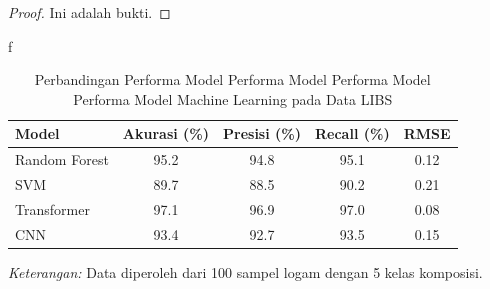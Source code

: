 \begin{proof}
Ini adalah bukti.
\end{proof}
 \begin{example}
        f
 \end{example}


 \begin{table}[H]
    \centering
    \caption{Perbandingan Performa Model Performa Model Performa Model Performa Model Machine Learning pada Data LIBS}
    \label{tab:performa_ml}
    \centering
    \begin{tabular}{lcccc}
      \toprule
      Model & Akurasi (\%) & Presisi (\%) & Recall (\%) & RMSE \\
      \midrule
      Random Forest & 95.2 & 94.8 & 95.1 & 0.12 \\
      SVM & 89.7 & 88.5 & 90.2 & 0.21 \\
      Transformer & 97.1 & 96.9 & 97.0 & 0.08 \\
      CNN & 93.4 & 92.7 & 93.5 & 0.15 \\
      \bottomrule
    \end{tabular}
    
    \smallskip
    \footnotesize
    \textit{Keterangan:} Data diperoleh dari 100 sampel logam dengan 5 kelas komposisi.
  \end{table}


%
